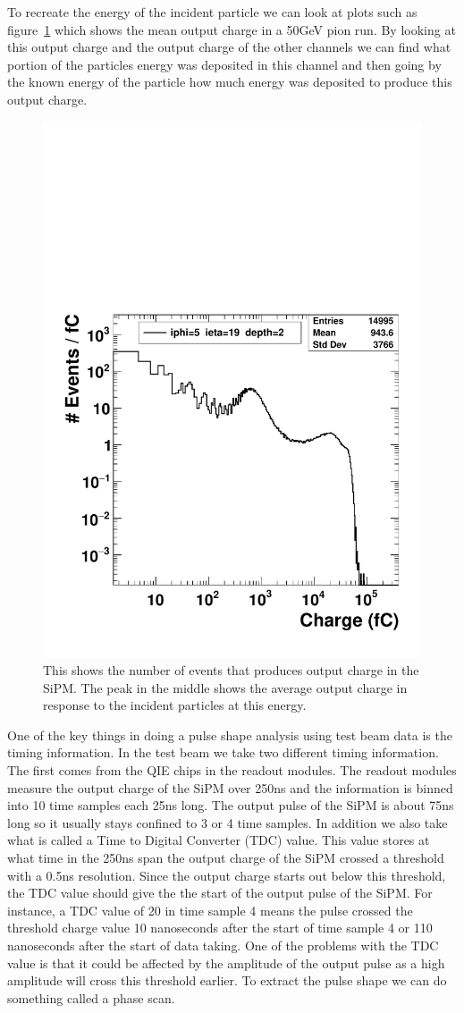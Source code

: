 To recreate the energy of the incident particle we can look at plots such as figure~\ref{fig:pioncharge} which shows the mean output charge in a 50GeV pion run. By looking at this output charge and the output charge of the other channels we can find what portion of the particles energy was deposited in this channel and then going by the known energy of the particle how much energy was deposited to produce this output charge. 

\begin{figure}
\centering
\includegraphics[width=0.7\linewidth]{Figures/pioncharge.pdf}
\caption{This shows the number of events that produces output charge in the SiPM. The peak in the middle shows the average output charge in response to the incident particles at this energy.}
\label{fig:pioncharge}
\end{figure}

One of the key things in doing a pulse shape analysis using test beam data is the timing information. In the test beam we take two different timing information. The first comes from the QIE chips in the readout modules. The readout modules measure the output charge of the SiPM over 250ns and the information is binned into 10 time samples each 25ns long. The output pulse of the SiPM is about 75ns long so it usually stays confined to 3 or 4 time samples. In addition we also take what is called a Time to Digital Converter (TDC) value. This value stores at what time in the 250ns span the output charge of the SiPM crossed a threshold with a 0.5ns resolution. Since the output charge starts out below this threshold, the TDC value should give the the start of the output pulse of the SiPM. For instance, a TDC value of 20 in time sample 4 means the pulse crossed the threshold charge value 10 nanoseconds after the start of time sample 4 or 110 nanoseconds after the start of data taking. One of the problems with the TDC value is that it could be affected by the amplitude of the output pulse as a high amplitude will cross this threshold earlier. To extract the pulse shape we can do something called a phase scan. 

